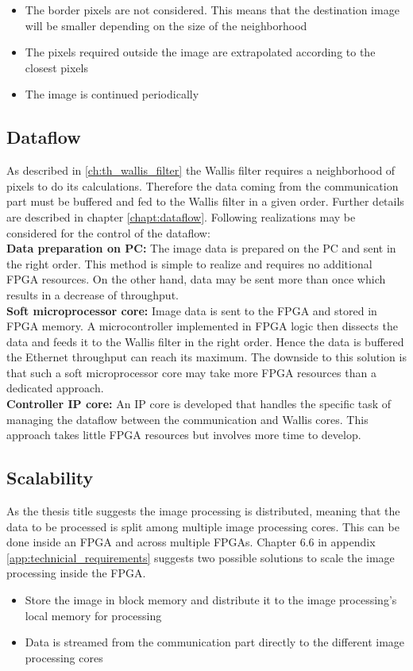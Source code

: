 \begin{itemize}
\item The border pixels are not considered. This means that the destination image will be smaller depending on the size of the neighborhood
\item The pixels required outside the image are extrapolated according to the closest pixels
\item The image is continued periodically
\end{itemize}

\subsection{Dataflow} \label{chapt:mission:dataflow}
As described in \ref{ch:th_wallis_filter} the Wallis filter requires a
neighborhood of pixels to do its calculations. Therefore the data coming from
the communication part must be buffered and fed to the Wallis filter in a given
order. Further details are described in chapter \ref{chapt:dataflow}. Following
realizations may be considered for the control of the dataflow:\\

\textbf{Data preparation on PC:} The image data is prepared on the PC and sent
in the right order. This method is simple to realize and requires no
additional FPGA resources. On the other hand, data may be sent more than once
which results in a decrease of throughput.\\

\textbf{Soft microprocessor core:} Image data is sent to the FPGA and stored in
FPGA memory. A microcontroller implemented in FPGA logic then dissects the data
and feeds it to the Wallis filter in the right order. Hence the data is buffered
the Ethernet throughput can reach its maximum. The downside to this
solution
is that such a soft microprocessor core may take more FPGA resources than a
dedicated approach.\\

\textbf{Controller IP core:} An IP core is developed that handles the specific
task of managing the dataflow between the communication and Wallis cores. This
approach takes little FPGA resources but involves more time to develop.

\subsection{Scalability} \label{chapt:mission:scalability}
As the thesis title suggests the image processing is distributed, meaning that
the data to be processed is split among multiple image processing cores. This
can be done inside an FPGA and across multiple FPGAs.
Chapter 6.6 in appendix \ref{app:technicial_requirements} suggests two possible
solutions to scale the image processing inside the FPGA.
\begin{itemize}
    \item Store the image in block memory and distribute it to the image
    processing's local memory for processing
    \item Data is streamed from the communication part directly to the different
    image processing cores
\end{itemize}

